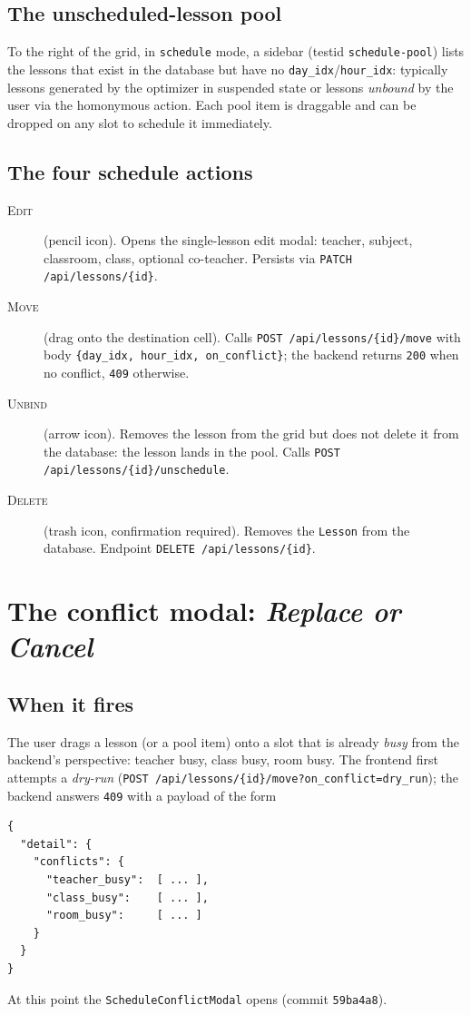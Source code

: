 \subsection{The unscheduled-lesson pool}

To the right of the grid, in \texttt{schedule} mode, a sidebar
(testid \texttt{schedule-pool}) lists the lessons that exist in
the database but have no \texttt{day\_idx}/\texttt{hour\_idx}:
typically lessons generated by the optimizer in suspended state
or lessons \emph{unbound} by the user via the homonymous action.
Each pool item is draggable and can be dropped on any slot to
schedule it immediately.

\subsection{The four schedule actions}

\begin{description}
  \item[\textsc{Edit}] (pencil icon). Opens the single-lesson
    edit modal: teacher, subject, classroom, class, optional
    co-teacher. Persists via \texttt{PATCH /api/lessons/\{id\}}.
  \item[\textsc{Move}] (drag onto the destination cell). Calls
    \texttt{POST /api/lessons/\{id\}/move} with body
    \texttt{\{day\_idx, hour\_idx, on\_conflict\}}; the backend
    returns \texttt{200} when no conflict, \texttt{409}
    otherwise.
  \item[\textsc{Unbind}] (arrow icon). Removes the lesson from
    the grid but does not delete it from the database: the
    lesson lands in the pool. Calls \texttt{POST
    /api/lessons/\{id\}/unschedule}.
  \item[\textsc{Delete}] (trash icon, confirmation required).
    Removes the \texttt{Lesson} from the database. Endpoint
    \texttt{DELETE /api/lessons/\{id\}}.
\end{description}

\section{The conflict modal: \emph{Replace or Cancel}}

\subsection{When it fires}

The user drags a lesson (or a pool item) onto a slot that is
already \emph{busy} from the backend's perspective: teacher
busy, class busy, room busy. The frontend first attempts a
\emph{dry-run} (\texttt{POST
/api/lessons/\{id\}/move?on\_conflict=dry\_run}); the backend
answers \texttt{409} with a payload of the form
\begin{lstlisting}[basicstyle=\ttfamily\footnotesize]
{
  "detail": {
    "conflicts": {
      "teacher_busy":  [ ... ],
      "class_busy":    [ ... ],
      "room_busy":     [ ... ]
    }
  }
}
\end{lstlisting}
At this point the \texttt{ScheduleConflictModal} opens (commit
\texttt{59ba4a8}).


